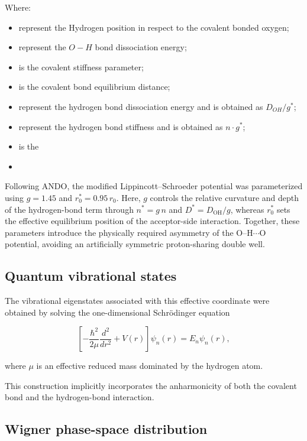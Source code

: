 \documentclass[12pt]{article}
\begin{document}
Where:

\begin{itemize}
	\item[$r$] represent the Hydrogen position in respect to the covalent bonded
	      oxygen;
	\item[$D_{OH}$] represent the $O-H$ bond dissociation energy;
	\item[$n$] is the covalent stiffness parameter;
	\item[$r_0$] is the covalent bond equilibrium distance;
	\item[$D^*$] represent the hydrogen bond dissociation energy and is obtained
	      as $D_{OH} / g^*$;
	\item[$n^*$] represent the hydrogen bond stiffness and is obtained
	      as $n \cdot g^*$;
	\item[$r_0^*$] is the
	\item[$R$]

\end{itemize}

Following ANDO, the modified Lippincott--Schroeder potential was
parameterized using $g = 1.45$ and $r_0^* = 0.95\,r_0$. Here, $g$
controls the relative curvature and depth of the hydrogen-bond term
through $n^* = g\,n$ and $D^* = D_{\mathrm{OH}}/g$, whereas $r_0^*$
sets the effective equilibrium position of the acceptor-side
interaction. Together, these parameters introduce the physically
required asymmetry of the O--H$\cdots$O potential, avoiding an
artificially symmetric proton-sharing double well.


\subsection*{Quantum vibrational states}

The vibrational eigenstates associated with this effective coordinate were
obtained by solving the one-dimensional Schrödinger equation

\[
	\left[
		- \frac{\hbar^2}{2\mu} \frac{d^2}{dr^2} + V(r)
		\right] \psi_n(r) = E_n \psi_n(r),
\]

where $\mu$ is an effective reduced mass dominated by the hydrogen atom.

This construction implicitly incorporates the anharmonicity of both the
covalent bond and the hydrogen-bond interaction.

\subsection*{Wigner phase-space distribution}
\end{document}
